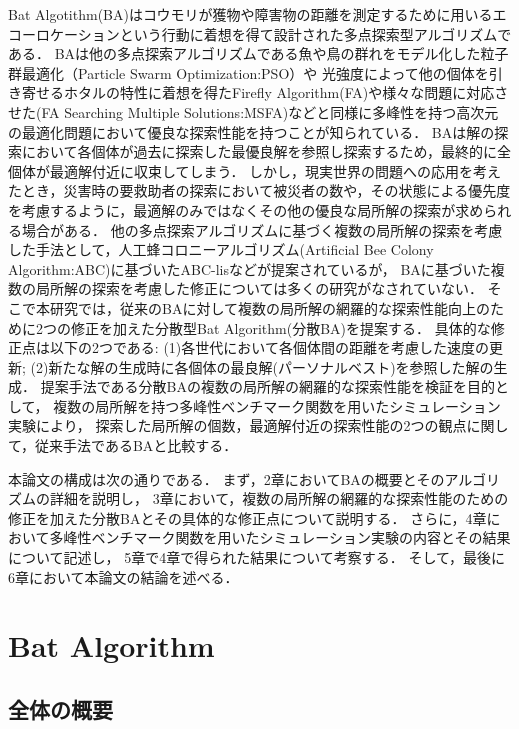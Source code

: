 \documentclass{jarticle}
\begin{document}
Bat Algotithm(BA)はコウモリが獲物や障害物の距離を測定するために用いるエコーロケーションという行動に着想を得て設計された多点探索型アルゴリズムである．\cite{1}
BAは他の多点探索アルゴリズムである魚や鳥の群れをモデル化した粒子群最適化（Particle Swarm Optimization:PSO）\cite{2}や
光強度によって他の個体を引き寄せるホタルの特性に着想を得たFirefly Algorithm(FA)\cite{3}や様々な問題に対応させた(FA Searching Multiple Solutions:MSFA)\cite{4}などと同様に多峰性を持つ高次元の最適化問題において優良な探索性能を持つことが知られている．
BAは解の探索において各個体が過去に探索した最優良解を参照し探索するため，最終的に全個体が最適解付近に収束してしまう．
しかし，現実世界の問題への応用を考えたとき，災害時の要救助者の探索において被災者の数や，その状態による優先度を考慮するように，最適解のみではなくその他の優良な局所解の探索が求められる場合がある．
他の多点探索アルゴリズムに基づく複数の局所解の探索を考慮した手法として，人工蜂コロニーアルゴリズム(Artificial Bee Colony Algorithm:ABC)に基づいたABC-lis\cite{5}などが提案されているが，
BAに基づいた複数の局所解の探索を考慮した修正については多くの研究がなされていない．
そこで本研究では，従来のBAに対して複数の局所解の網羅的な探索性能向上のために2つの修正を加えた分散型Bat Algorithm(分散BA)を提案する．
具体的な修正点は以下の2つである:
(1)各世代において各個体間の距離を考慮した速度の更新;
(2)新たな解の生成時に各個体の最良解(パーソナルベスト)を参照した解の生成．
提案手法である分散BAの複数の局所解の網羅的な探索性能を検証を目的として，
複数の局所解を持つ多峰性ベンチマーク関数を用いたシミュレーション実験により，
探索した局所解の個数，最適解付近の探索性能の2つの観点に関して，従来手法であるBAと比較する．

本論文の構成は次の通りである．
まず，2章においてBAの概要とそのアルゴリズムの詳細を説明し，
3章において，複数の局所解の網羅的な探索性能のための修正を加えた分散BAとその具体的な修正点について説明する．
さらに，4章において多峰性ベンチマーク関数を用いたシミュレーション実験の内容とその結果について記述し，
5章で4章で得られた結果について考察する．
そして，最後に6章において本論文の結論を述べる．
\section{Bat Algorithm}

\subsection{全体の概要}
\end{document}
